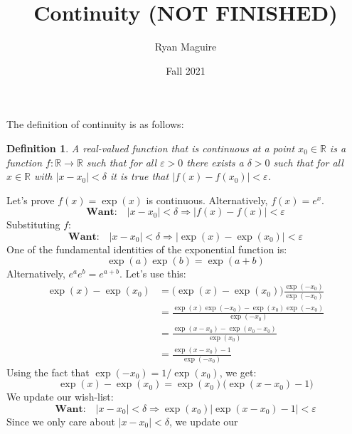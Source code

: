\documentclass{article}
\title{Continuity (NOT FINISHED)}
\author{Ryan Maguire}
\date{Fall 2021}
\theoremstyle{normal}
\newtheorem{definition}{Definition}
\theoremstyle{plain}
\begin{document}
    \maketitle
    The definition of continuity is as follows:
    \begin{definition}
        A real-valued function that is continuous at a point
        $x_{0}\in\mathbb{R}$ is a function $f:\mathbb{R}\rightarrow\mathbb{R}$
        such that for all $\varepsilon>0$ there exists a $\delta>0$ such that
        for all $x\in\mathbb{R}$ with $|x-x_{0}|<\delta$ it is true that
        $|f(x)-f(x_{0})|<\varepsilon$.
    \end{definition}
    Let's prove $f(x)=\exp(x)$ is continuous. Alternatively, $f(x)=e^{x}$.
    \begin{equation}
        \textbf{Want:}\quad
        |x-x_{0}|<\delta
        \Rightarrow|f(x)-f(x)|<\varepsilon
    \end{equation}
    Substituting $f$:
    \begin{equation}
        \textbf{Want:}\quad
        |x-x_{0}|<\delta
        \Rightarrow
        |\exp(x)-\exp(x_{0})|<\varepsilon
    \end{equation}
    One of the fundamental identities of the exponential function is:
    \begin{equation}
        \exp(a)\exp(b)=\exp(a+b)
    \end{equation}
    Alternatively, $e^{a}e^{b}=e^{a+b}$. Let's use this:
    \begin{align}
        \exp(x)-\exp(x_{0})
            &=\big(\exp(x)-\exp(x_{0})\big)\frac{\exp(-x_{0})}{\exp(-x_{0})}\\
            &=\frac{\exp(x)\exp(-x_{0})-\exp(x_{0})\exp(-x_{0})}{\exp(-x_{0})}\\
            &=\frac{\exp(x-x_{0})-\exp(x_{0}-x_{0})}{\exp(x_{0})}\\
            &=\frac{\exp(x-x_{0})-1}{\exp(-x_{0})}
    \end{align}
    Using the fact that $\exp(-x_{0})=1/\exp(x_{0})$, we get:
    \begin{equation}
        \exp(x)-\exp(x_{0})
        =\exp(x_{0})\big(\exp(x-x_{0})-1\big)
    \end{equation}
    We update our wish-list:
    \begin{equation}
        \textbf{Want:}\quad
        |x-x_{0}|<\delta
        \Rightarrow
        \exp(x_{0})\big|\exp(x-x_{0})-1\big|<\varepsilon
    \end{equation}
    Since we only care about $|x-x_{0}|<\delta$, we update our
\end{document}

